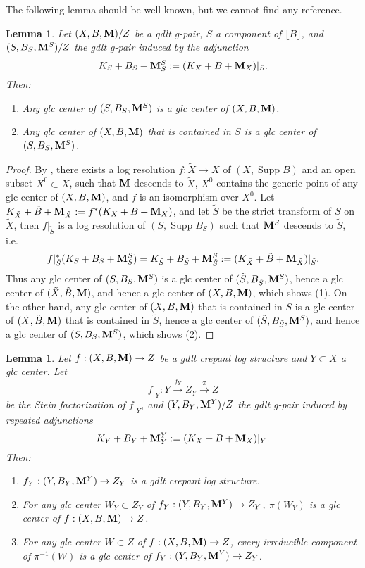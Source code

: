\documentclass[11pt]{amsart}
\numberwithin{equation}{section}
\newcommand{\Mm}{{\bf{M}}}
\newcommand{\Supp}{\operatorname{Supp}}
\newtheorem{lem}[thm]{Lemma}
\theoremstyle{definition}
\theoremstyle{definition}
\theoremstyle{definition}
\begin{document}
The following lemma should be well-known, but we cannot find any reference.
\begin{lem}\label{lem: inversion of adjunction}
Let $(X,B,\Mm)/Z$ be a gdlt g-pair, $S$ a component of $\lfloor B\rfloor$, and $(S,B_S,\Mm^S)/Z$ the gdlt g-pair induced by the adjunction 
$$K_S+B_S+\Mm^S_S:=(K_X+B+\Mm_X)|_S.$$
Then:
\begin{enumerate}
    \item Any glc center of $(S,B_S,\Mm^S)$ is a glc center of $(X,B,\Mm)$.
    \item Any glc center of $(X,B,\Mm)$ that is contained in $S$ is a glc center of $(S,B_S,\Mm^S)$.
\end{enumerate}
\end{lem}
\begin{proof}
By \cite[Theorem 6.1]{Has22}, there exists a log resolution $f: \tilde X\rightarrow X$ of $(X,\Supp B)$ and an open subset $X^0\subset X$, such that $\Mm$ descends to $\tilde X$, $X^0$ contains the generic point of any glc center of $(X,B,\Mm)$, and $f$ is an isomorphism over $X^0$. Let $K_{\tilde X}+\tilde B+\Mm_{\tilde X}:=f^*(K_X+B+\Mm_X)$, and let $\tilde S$ be the strict transform of $S$ on $\tilde X$, then
$f|_{\tilde S}$ is a log resolution of $(S,\Supp B_S)$ such that $\Mm^S$ descends to $\tilde S$, i.e.
$$f|_{\tilde S}^*(K_S+B_S+\Mm^S_S)=K_{\tilde S}+B_{\tilde S}+\Mm^S_{\tilde S}:=(K_{\tilde X}+\tilde B+\Mm_{\tilde X})|_{\tilde S}.$$
Thus any glc center of $(S,B_S,\Mm^S)$ is a glc center of $(\tilde S,B_{\tilde S},\Mm^S)$, hence a glc center of $(\tilde X,\tilde B,\Mm)$, and hence a glc center of $(X,B,\Mm)$, which shows (1). On the other hand, any glc center of $(X,B,\Mm)$ that is contained in $S$ is a glc center of $(\tilde X,\tilde B,\Mm)$ that is contained in $\tilde S$, hence a glc center of $(\tilde S,B_{\tilde S},\Mm^S)$, and hence a glc center of $(S,B_S,\Mm^S)$, which shows (2).
\end{proof}


\begin{lem}\label{lem: gdlt crepant log structure is compatible under subadjunction}
Let $f: (X,B,\Mm)\to Z$ be a gdlt crepant log structure and $Y\subset X$ a glc center. Let
$$
f|_Y: Y\xrightarrow{f_Y}Z_Y\xrightarrow{\pi} Z
$$
be the Stein factorization of $f|_Y$, and $(Y,B_Y,\Mm^Y)/Z$ the gdlt g-pair induced by repeated adjunctions
$$K_Y+B_Y+\Mm_Y^Y:=(K_X+B+\Mm_X)|_Y.$$
Then:
\begin{enumerate}
\item $f_Y: (Y,B_Y,\Mm^Y)\rightarrow Z_Y$ is a gdlt crepant log structure.
\item For any glc center $W_Y\subset Z_Y$ of $f_Y: (Y,B_Y,\Mm^Y)\rightarrow Z_Y$, $\pi(W_Y)$ is a glc center of $f: (X,B,\Mm)\rightarrow Z$.
\item For any glc center $W\subset Z$ of $f: (X,B,\Mm)\rightarrow Z$, every irreducible component of $\pi^{-1}(W)$ is a glc center of  $f_Y: (Y,B_Y,\Mm^Y)\rightarrow Z_Y$.
\end{enumerate}
\end{lem}
\end{document}
